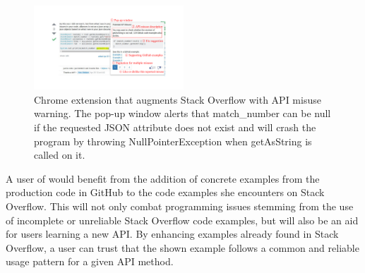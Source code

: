 \begin{figure}
\centering
\includegraphics[width=0.5\textwidth]{soap-v3.pdf}
  \vspace{.1in}
  \caption{{\tool} Chrome extension that augments Stack Overflow with API misuse warning. The pop-up window alerts that {\ttt match\_number} can be {\ttt null} if the requested {\ttt JSON} attribute does not exist and will crash the program by throwing {\ttt NullPointerException} when {\ttt getAsString} is called on it.\protect\footnotemark}
  \label{fig:screenshot}
\end{figure}


A user of {\tool} would benefit from the addition of concrete examples from the production code in GitHub  to the code examples she encounters on Stack Overflow. This will not only combat programming issues stemming from the use of incomplete or unreliable Stack Overflow code examples, but will also be an aid for users learning a new API. By enhancing examples already found in Stack Overflow, a user can trust that the shown example follows a common and reliable usage pattern for a given API method.

%
